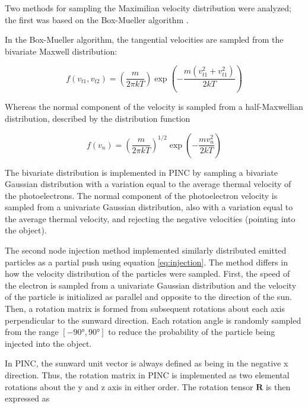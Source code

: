 Two methods for sampling the Maximilian velocity distribution were analyzed; the first was based on the Box-Mueller algorithm .

In the Box-Mueller algorithm, the tangential velocities are sampled from the bivariate Maxwell distribution:

\begin{equation}\label{eq:bivariateMaxell}
    f(v_{t1}, v_{t2}) = \left(\frac{m}{2 \pi k T}  \right) \exp \left(- \frac{m (v^2_{t1} + v^2_{t1})}{2 k T} \right)
\end{equation}

Whereas the normal component of the velocity is sampled from a half-Maxwellian distribution, described by the distribution function

\begin{equation}\label{eq:halfMaxwell}
    f(v_n) = \left(\frac{m}{2 \pi k T}\right)^{1/2} \exp \left(- \frac{m v^2_n}{2 k T} \right)
\end{equation}

The bivariate distribution is implemented in PINC by sampling a bivariate Gaussian distribution with a variation equal to the average thermal velocity of the photoelectrons. The normal component of the photoelectron velocity is sampled from a univariate Gaussian distribution, also with a variation equal to the average thermal velocity, and rejecting the negative velocities (pointing into the object).

The second node injection method implemented similarly distributed emitted particles as a partial push using equation \ref{eq:injection}. The method differs in how the velocity distribution of the particles were sampled. First, the speed of the electron is sampled from a univariate Gaussian distribution and the velocity of the particle is initialized as parallel and opposite to the direction of the sun. Then, a rotation matrix is formed from subsequent rotations about each axis perpendicular to the sunward direction. Each rotation angle is randomly sampled from the range $[\ang{-90}, \ang{90}]$ to reduce the probability of the particle being injected into the object.

In PINC, the sunward unit vector is always defined as being in the negative x direction. Thus, the rotation matrix in PINC is implemented as two elemental rotations about the y and z axis in either order. The rotation tensor $\pmb{R}$ is then expressed as

